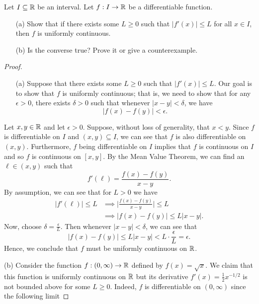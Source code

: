 \documentclass[a4paper]{article}
\begin{document}
\begin{problem}
    Let \( I \subseteq  \mathbb{R}   \) be an interval. Let \( f: I \to \mathbb{R}  \) be a differentiable function. 
    \begin{enumerate}
        \item[(a)] Show that if there exists some \( L \geq 0  \) such that \( | f'(x) | \leq L  \) for all \( x \in I  \), then \( f  \) is uniformly continuous.
        \item[(b)] Is the converse true? Prove it or give a counterexample. 
    \end{enumerate}
\end{problem}

\begin{proof}
\begin{enumerate}
    \item[(a)] Suppose that there exists some \( L \geq 0  \) such that \( | f'(x) |  \leq L  \). Our goal is to show that \( f  \) is uniformly continuous; that is, we need to show that for any \( \epsilon > 0  \), there exists \( \delta > 0  \) such that whenever \( | x - y  |  < \delta  \), we have
        \[  | f(x) - f(y) |  < \epsilon. \]
\end{enumerate}
Let \( x,y \in \mathbb{R}  \) and let \( \epsilon > 0  \). Suppose, without loss of generality, that \( x < y  \). Since \( f \) is differentiable on \( I  \) and \( (x,y) \subseteq  I  \), we can see that \( f  \) is also differentiable on \( (x,y) \). Furthermore, \( f  \) being differentiable on \( I \) implies that \( f  \) is continuous on \( I  \) and so \( f  \) is continuous on \( [x,y] \). By the Mean Value Theorem, we can find an \( \ell \in (x,y) \) such that   
\[  f'(\ell) = \frac{ f(x) - f(y) }{ x - y  }. \]
By assumption, we can see that for \( L > 0 \) we have 
\begin{align*}
| f'(\ell) | \leq L &\implies \Big|  \frac{ f(x) - f(y) }{ x - y  }  \Big| \leq L \\   
                    &\implies | f(x) - f(y) | \leq L | x - y |.
\end{align*} 
Now, choose \( \delta = \frac{ \epsilon  }{  L  }  \). Then whenever \( | x - y  |  < \delta \), we can see that 
\[  | f(x) - f(y)  |  \leq L | x - y  |  < L \cdot \frac{ \epsilon  }{  L  }   =  \epsilon. \]
Hence, we conclude that \( f  \) must be uniformly continuous on \( \mathbb{R}  \).
    \item[(b)] Consider the function \( f: (0,\infty ) \to \mathbb{R}  \) defined by \( f(x) = \sqrt{ x }  \). We claim that this function is uniformly continuous on \( \mathbb{R}  \) but its derivative \( f'(x) = \frac{ 1 }{ 2 }  x^{-1/2} \) is not bounded above for some \( L \geq 0  \). Indeed, \( f  \) is differentiable on \( (0,\infty ) \) since the following limit  

\end{proof}
\end{document}

